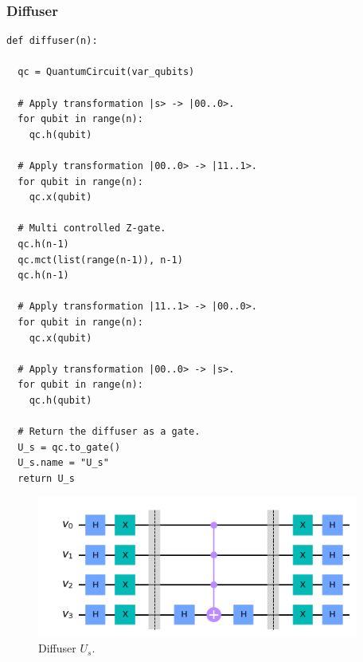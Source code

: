 \documentclass{article}
\begin{document}
\subsubsection{Diffuser}
\begin{verbatim}
def diffuser(n):

  qc = QuantumCircuit(var_qubits)

  # Apply transformation |s> -> |00..0>.
  for qubit in range(n):
    qc.h(qubit)

  # Apply transformation |00..0> -> |11..1>.
  for qubit in range(n):
    qc.x(qubit)

  # Multi controlled Z-gate.
  qc.h(n-1)
  qc.mct(list(range(n-1)), n-1)
  qc.h(n-1)

  # Apply transformation |11..1> -> |00..0>.
  for qubit in range(n):
    qc.x(qubit)

  # Apply transformation |00..0> -> |s>.
  for qubit in range(n):
    qc.h(qubit)

  # Return the diffuser as a gate.
  U_s = qc.to_gate()
  U_s.name = "U_s"
  return U_s
\end{verbatim}
\begin{figure}[H]
  \centering
  \includegraphics[width=300pt]{Img/us-circuit.png}
  \caption{Diffuser $U_s$.}
\end{figure}
\end{document}
